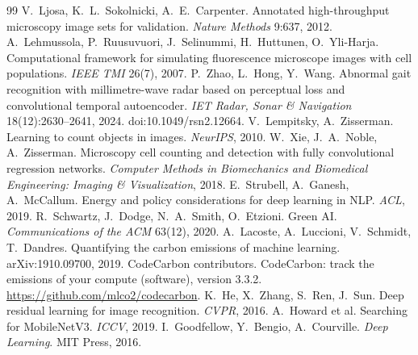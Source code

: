 \documentclass[11pt,a4paper]{article}
\begin{document}
\begin{thebibliography}{99}\small
{} V.~Ljosa, K.~L.~Sokolnicki, A.~E.~Carpenter. Annotated high-throughput microscopy image
sets for validation. \emph{Nature Methods} 9:637, 2012.
 A.~Lehmussola, P.~Ruusuvuori, J.~Selinummi, H.~Huttunen, O.~Yli-Harja. Computational
framework for simulating fluorescence microscope images with cell populations. \emph{IEEE TMI} 26(7), 2007.
 P.~Zhao, L.~Hong, Y.~Wang. Abnormal gait recognition with millimetre-wave radar based on
perceptual loss and convolutional temporal autoencoder. \emph{IET Radar, Sonar \& Navigation} 18(12):2630--2641, 2024. doi:10.1049/rsn2.12664.
 V.~Lempitsky, A.~Zisserman. Learning to count objects in images. \emph{NeurIPS}, 2010.
 W.~Xie, J.~A.~Noble, A.~Zisserman. Microscopy cell counting and detection with fully
convolutional regression networks. \emph{Computer Methods in Biomechanics and Biomedical Engineering:
Imaging \& Visualization}, 2018.
 E.~Strubell, A.~Ganesh, A.~McCallum. Energy and policy considerations for deep learning
in NLP. \emph{ACL}, 2019.
 R.~Schwartz, J.~Dodge, N.~A.~Smith, O.~Etzioni. Green AI. \emph{Communications of the
ACM} 63(12), 2020.
 A.~Lacoste, A.~Luccioni, V.~Schmidt, T.~Dandres. Quantifying the carbon emissions of
machine learning. arXiv:1910.09700, 2019.
 CodeCarbon contributors. CodeCarbon: track the emissions of your compute (software), version 3.3.2. \url{https://github.com/mlco2/codecarbon}.
 K.~He, X.~Zhang, S.~Ren, J.~Sun. Deep residual learning for image recognition. \emph{CVPR}, 2016.
 A.~Howard et al. Searching for MobileNetV3. \emph{ICCV}, 2019.
 I.~Goodfellow, Y.~Bengio, A.~Courville. \emph{Deep Learning}. MIT Press, 2016.
\end{thebibliography}

\appendix
\end{document}
